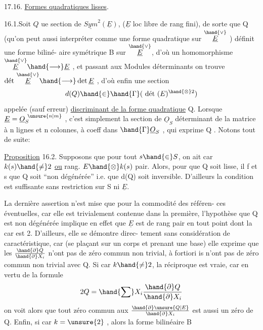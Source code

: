   

17.16. \uline{Formes quadratiques lisses}.

16.1.Soit $Q$ ue section de $\underline{Sym}^2(\underline{E})$, ($\underline{E}$ loc libre de rang fini),
de sorte que Q  (qu'on peut aussi interpréter comme une forme
quadratique sur $\overset{\hand{\vee}}{\underline{E}}$ )  définit une forme biliné-%
aire symétrique B sur $\overset{\hand{\vee}}{\underline{E}}$, d'où un homomorphisme $\overset{\hand{\vee}}{\underline{E}} \hand{\longrightarrow} \underline{E}$ , et passant aux
Modules déterminants on trouve $\text{dét}\ \overset{\hand{\vee}}{\underline{E}} \hand{\longrightarrow} \det \underline{E}$ , d'où enfin une section
\[ d(Q) \hand{\in} \hand{\Gamma}(\ \text{dét}\ (E)^{\hand{\otimes} 2}) \]
appelée (sauf erreur) \uline{discriminant de la forme quadratique} Q. Lorsque
$\underline{E} = \underline{O}_S^{\ \unsure{n|m}}$ , c'est simplement la section de $\underline{O}_S$ déterminant de la matrice
à n lignes et n colonnes, à coeff dans $\hand{\Gamma}\underline{O}_S$ , qui exprime Q . Notons tout
de suite:

\uline{Proposition} 16.2. Supposons que pour tout $s \hand{\in} S$, on ait car $k(s) \hand{\neq} 2$ \uline{ou}
rang. $E\hand{\otimes} k(s)$ pair. Alors, pour que Q soit lisse, il f et s que Q soit
``non dégénérée'' i.e. que d(Q) soit inversible. \hand{(}D'ailleurs la condition est
suffisante sans restriction sur S ni $\underline{E}$\hand{)}.

La dernière assertion n'est mise que pour la commodité des référen-%
ces éventuelles, car elle est trivialement contenue dans la première,
l'hypothèse que Q est non dégénérée implique en effet que $\underline{E}$ est de rang
pair en tout point dont la car est 2. D'ailleurs, elle se démontre direc-%
tement sans considération de caractéristique, car (se plaçant sur un corps
 et prenant une base) elle exprime que les $\frac{\hand{\partial} Q}{\hand{\partial} X_i}$ n'ont pas de zéro commun
non trivial, à fortiori is n'ont pas de zéro commun non trivial avec Q.
Si car $k \hand{\neq} 2$, la réciproque est vraie, car en vertu de la formule
\[ 2Q = \hand{\sum} X_i \frac{\hand{\partial} Q}{\hand{\partial} X_i} \]
on voit alors que tout zéro commun aux $\frac{\hand{\partial} \unsure{Q|E}}{\hand{\partial} X_i}$ est aussi un zéro de Q. Enfin,
si car $k = \unsure{2}$ ,  alors la forme bilinéaire B

